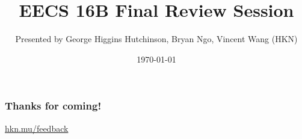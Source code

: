 

\title{EECS 16B Final Review Session}
\author{Presented by George Higgins Hutchinson, Bryan Ngo, Vincent Wang (HKN)}
\date{\today}

\newcommand{\SlideAccessingLogistics}{@2229}




















\begin{frame}
    \frametitle{Thanks for coming!}
    \href{https://hkn.mu/feedback}{hkn.mu/feedback}
\end{frame}


